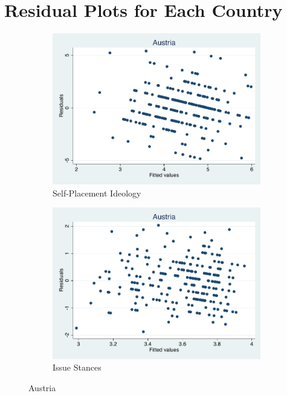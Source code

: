 \documentclass[12pt, titlepage]{article}
\begin{document}
\section{Residual Plots for Each Country}


\begin{figure}[H]
	\centering
	\begin{subfigure}[b]{0.475\textwidth}   
		\centering 
		\includegraphics[width=\textwidth]{Residuals/CountryIdeo/Austria}
		\caption{Self-Placement Ideology}
	\end{subfigure}
	\hfill
	\begin{subfigure}[b]{0.475\textwidth}
		\centering 
		\includegraphics[width=\textwidth]{Residuals/CountryLib/Austria}
		\caption{Issue Stances}
	\end{subfigure}
	\caption{Austria}
	\label{Austria}
\end{figure}
\end{document}
